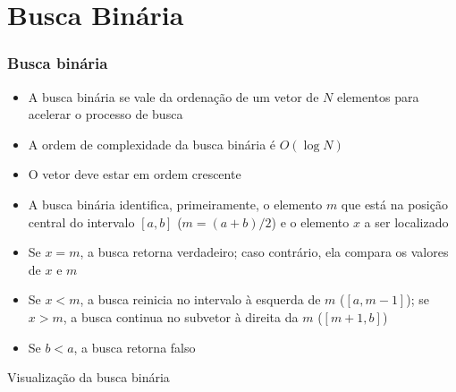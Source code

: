 \section{Busca Binária}

\begin{frame}[fragile]\frametitle{Busca binária}

	\begin{itemize}
		\item A busca binária se vale da ordenação de um vetor de $N$ elementos para acelerar o 
        processo de busca

		\item A ordem de complexidade da busca binária é $O(\log N)$

		\item O vetor deve estar em ordem crescente

        \item A busca binária identifica, primeiramente, o elemento $m$ que está na posição central         do intervalo $[a, b]$ ($m = (a + b)/2$) e o elemento $x$ a ser localizado

        \item Se $x = m$, a busca retorna verdadeiro; caso contrário, ela compara os valores de $x$         e $m$

        \item Se $x < m$, a busca reinicia no intervalo à esquerda de $m$ ($[a, m - 1]$); 
        se $x > m$, a busca continua no subvetor à direita da $m$ ($[m + 1, b]$)

        \item Se $b < a$, a busca retorna falso
	\end{itemize}
 
\end{frame}  

\begin{frame}[fragile]{Visualização da busca binária}


\end{frame}

